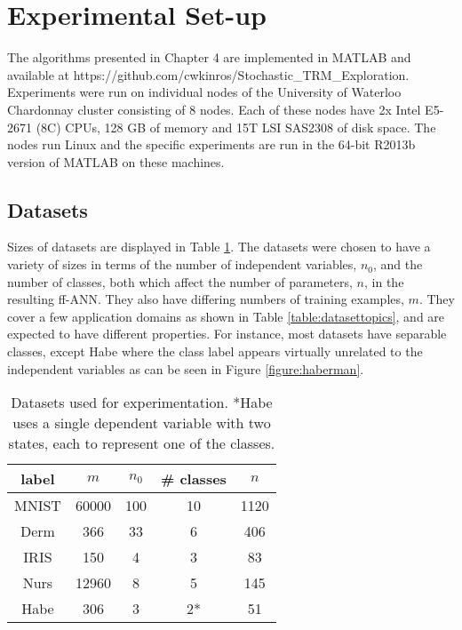 \documentclass[letterpaper,12pt,titlepage,oneside,final]{book}
\begin{document}
	
	\section{Experimental Set-up}
	
	The algorithms presented in Chapter 4 are implemented in MATLAB and available at  https://github.com/cwkinros/Stochastic\_TRM\_Exploration. Experiments were run on individual nodes of the University of Waterloo Chardonnay cluster consisting of 8 nodes. Each of these nodes have 2x Intel E5-2671 (8C) CPUs, 128 GB of memory and 15T LSI SAS2308 of disk space. The nodes run Linux and the specific experiments are run in the 64-bit R2013b version of MATLAB on these machines.
	
	\subsection{Datasets}
	
	Sizes of datasets are displayed in Table \ref{table:datasets}. The datasets were chosen to have a variety of sizes in terms of the number of independent variables, $n_{0}$, and the number of classes, both which affect the number of parameters, $n$, in the resulting ff-ANN. They also have differing numbers of training examples, $m$. They cover a few application domains as shown in Table \ref{table:datasettopics}, and are expected to have different properties. For instance, most datasets have separable classes, except Habe where the class label appears virtually unrelated to the independent variables as can be seen in Figure \ref{figure:haberman}.
	
	\begin{table}[h]
		\begin{center}
			\begin{tabular}{ |c|c|c|c|c| }  
				\hline
				\textbf{label} & \textbf{$m$} & \textbf{$n_{0}$} & \textbf{\# classes} & $n$  \\
				\hline
				MNIST & 60000 & 100 & 10 & 1120 \\
				Derm & 366 & 33 & 6 & 406 \\
				IRIS & 150 & 4 & 3 & 83\\
				Nurs & 12960 & 8 & 5 & 145 \\
				Habe & 306 & 3 & 2* & 51 \\ 
				\hline
			\end{tabular}
			\caption{Datasets used for experimentation. *Habe uses a single dependent variable with two states, each to represent one of the classes.}
			\label{table:datasets}
		\end{center}
	\end{table}
	
\end{document}
